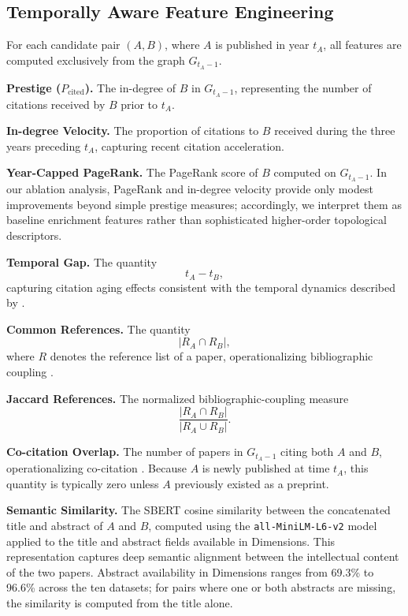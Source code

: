 \documentclass[11pt,a4paper]{article}
\begin{document}
\subsection{Temporally Aware Feature Engineering}

For each candidate pair \((A,B)\), where \(A\) is published in year \(t_A\), all features are computed exclusively from the graph \(G_{t_A-1}\).

\textbf{Prestige (\(P_{\mathrm{cited}}\)).}
The in-degree of \(B\) in \(G_{t_A-1}\), representing the number of citations received by \(B\) prior to \(t_A\).

\textbf{In-degree Velocity.}
The proportion of citations to \(B\) received during the three years preceding \(t_A\), capturing recent citation acceleration.

\textbf{Year-Capped PageRank.}
The PageRank score of \(B\) computed on \(G_{t_A-1}\). In our ablation analysis, PageRank and in-degree velocity provide only modest improvements beyond simple prestige measures; accordingly, we interpret them as baseline enrichment features rather than sophisticated higher-order topological descriptors.

\textbf{Temporal Gap.}
The quantity
\[
t_A - t_B,
\]
capturing citation aging effects consistent with the temporal dynamics described by \citet{wang2013quantifying}.

\textbf{Common References.}
The quantity
\[
|R_A \cap R_B|,
\]
where \(R\) denotes the reference list of a paper, operationalizing bibliographic coupling \citep{kessler1963bibliographic}.

\textbf{Jaccard References.}
The normalized bibliographic-coupling measure
\[
\frac{|R_A \cap R_B|}
{|R_A \cup R_B|}.
\]

\textbf{Co-citation Overlap.}
The number of papers in \(G_{t_A-1}\) citing both \(A\) and \(B\), operationalizing co-citation \citep{small1973co}. Because \(A\) is newly published at time \(t_A\), this quantity is typically zero unless \(A\) previously existed as a preprint.

\textbf{Semantic Similarity.}
The SBERT cosine similarity between the concatenated title and abstract of \(A\) and \(B\), computed using the \texttt{all-MiniLM-L6-v2} model applied to the title and abstract fields available in Dimensions. This representation captures deep semantic alignment between the intellectual content of the two papers. Abstract availability in Dimensions ranges from 69.3\% to 96.6\% across the ten datasets; for pairs where one or both abstracts are missing, the similarity is computed from the title alone.
\end{document}
